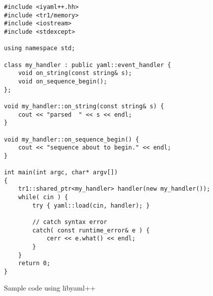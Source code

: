 \documentclass{article}
\begin{document}
\begin{figure}
  \caption{Sample code using libyaml++}
  \begin{verbatim}
#include <iyaml++.hh>
#include <tr1/memory>
#include <iostream>
#include <stdexcept>

using namespace std;

class my_handler : public yaml::event_handler {
    void on_string(const string& s);
    void on_sequence_begin();
};

void my_handler::on_string(const string& s) {
    cout << "parsed  " << s << endl;
}

void my_handler::on_sequence_begin() {
    cout << "sequence about to begin." << endl;
}

int main(int argc, char* argv[])
{
    tr1::shared_ptr<my_handler> handler(new my_handler());
    while( cin ) {
        try { yaml::load(cin, handler); }

        // catch syntax error
        catch( const runtime_error& e ) {
            cerr << e.what() << endl;
        }
    }
    return 0;
}
\end{verbatim}
\end{figure}
\end{document}
